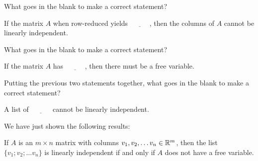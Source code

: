 
\edXsolution{ 
}
\endedxproblem






What goes in the blank to make a correct statement?

If the matrix $A$ when row-reduced yields $\underline{\;\;\;\;\;\;\;\;\;\;}$, then
the columns of $A$ cannot be linearly independent.  


\edXsolution{ 
}
\endedxproblem



What goes in the blank to make a correct statement?

If the matrix $A$ has $\underline{\;\;\;\;\;\;\;\;\;\;}$, then
there must be a free variable.  


\edXsolution{ 
}
\endedxproblem



Putting the previous two statements together, what goes in the blank to make a correct statement?  

A list of  $\underline{\;\;\;\;\;\;\;\;\;\;}$ cannot be linearly independent.


\edXsolution{ 
}
\endedxproblem




\endedxvertical





We have just shown the following results:  

If $A$ is an $m\times n$ matrix with columns 
$v_1, v_2, \ldots v_n \in \mathbb R^m$, then the list $\{v_1; v_2; \ldots v_n\}$ is linearly independent
if and only if $A$ does not have a free variable.  

